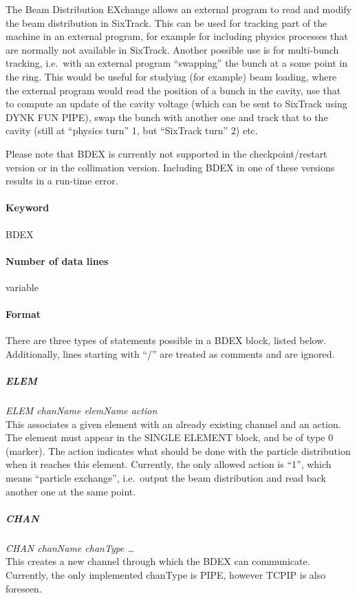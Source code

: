 \documentclass[a4paper,11pt]{report}
\begin{document}
The Beam Distribution EXchange allows an external program to read and modify the beam distribution in SixTrack.
This can be used for tracking part of the machine in an external program, for example for including physics processes that are normally not available in SixTrack.
Another possible use is for multi-bunch tracking, i.e.\ with an external program ``swapping'' the bunch at a some point in the ring.
This would be useful for studying (for example) beam loading, where the external program would read the position of a bunch in the cavity, use that to compute an update of the cavity voltage (which can be sent to SixTrack using DYNK FUN PIPE), swap the bunch with another one and track that to the cavity (still at ``physics turn'' 1, but ``SixTrack turn'' 2) etc.

Please note that BDEX is currently not supported in the checkpoint/restart version or in the collimation version.
Including BDEX in one of these versions results in a run-time error.

\paragraph{Keyword} BDEX

\paragraph{Number of data lines} variable

\paragraph{Format}
There are three types of statements possible in a BDEX block, listed below.
Additionally, lines starting with ``/'' are treated as comments and are ignored.

\subparagraph{ELEM} \emph{ELEM chanName elemName action}\\
This associates a given element with an already existing channel and an action.
The element must appear in the SINGLE ELEMENT block, and be of type 0 (marker).
The action indicates what should be done with the particle distribution when it reaches this element.
Currently, the only allowed action is ``1'', which means ``particle exchange'', i.e.\ output the beam distribution and read back another one at the same point.

\subparagraph{CHAN} \emph{CHAN chanName chanType \ldots}\\
This creates a new channel through which the BDEX can communicate.
Currently, the only implemented chanType is PIPE, however TCPIP is also foreseen.
\end{document}

